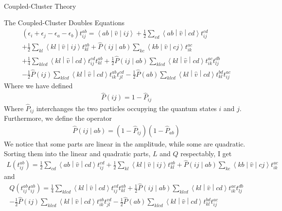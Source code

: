 \documentclass[twoside,english]{uiofysmaster}
\begin{document}
\begin{chapter}{Coupled-Cluster Theory}
\begin{section}{The Coupled-Cluster Doubles Equations}
  		\begin{align}
  			(\epsilon_i + \epsilon_j - \epsilon_a - \epsilon_b) t_{ij}^{ab} = \left<ab\middle|\hat v\middle|ij\right> + \frac{1}{2} \sum_{cd}\left<ab\middle|\hat v\middle|cd\right>t_{ij}^{cd} \\
  			+ \frac{1}{2} \sum_{kl} \left<kl\middle|\hat v\middle|ij\right>t_{kl}^{ab} + \hat P\left(ij\middle|ab\right) \sum_{kc}\left<kb\middle|\hat v\middle|cj\right>t_{ik}^{ac} \\
  			+ \frac{1}{4} \sum_{klcd}\left<kl\middle|\hat v\middle|cd\right>t_{ij}^{cd} t_{kl}^{ab} + \frac{1}{2} \hat P\left(ij\middle|ab\right) \sum_{klcd}\left<kl\middle|\hat v\middle|cd\right>t_{ik}^{ac} t_{lj}^{db}\\
  			- \frac{1}{2}\hat P(ij) \sum_{klcd}\left<kl\middle|\hat v\middle|cd\right>t_{ik}^{ab} t_{jl}^{cd} - \frac{1}{2}\hat P(ab) \sum_{klcd}\left<kl\middle|\hat v\middle|cd\right>t_{kl}^{bd} t_{ij}^{ac}
  			\label{CCD_equations1}
  		\end{align}
  		Where we have defined
  		\begin{align}
  			\hat P(ij) = 1 - \hat P_{ij}
  		\end{align}
  		Where $\hat P_{ij}$ interchanges the two particles occupying the quantum states $i$ and $j$. Furthermore, we define the operator 
  		\begin{align}
  			\hat P\left( ij \middle| ab \right) = (1 - \hat P_{ij}) (1 - \hat P_{ab})
  		\end{align}
  		We notice that some parts are linear in the amplitude, while some are quadratic. Sorting them into the linear and quadratic parts, $L$ and $Q$ respectably, I get
  		\begin{align}
  			L(t_{ij}^{ab}) = \frac{1}{2} \sum_{cd}\left<ab\middle|\hat v\middle|cd\right>t_{ij}^{cd} + \frac{1}{2} \sum_{kl} \left<kl\middle|\hat v\middle|ij\right>t_{kl}^{ab} + \hat P\left(ij\middle|ab\right) \sum_{kc}\left<kb\middle|\hat v\middle|cj\right>t_{ik}^{ac}
  		\end{align}
  		and 
  		\begin{align}
  			Q(t_{ij}^{ab}t_{ij}^{ab}) = \frac{1}{4} \sum_{klcd}\left<kl\middle|\hat v\middle|cd\right>t_{ij}^{cd} t_{kl}^{ab} + \frac{1}{2} \hat P\left(ij\middle|ab\right) \sum_{klcd}\left<kl\middle|\hat v\middle|cd\right>t_{ik}^{ac} t_{lj}^{db} \\
  			- \frac{1}{2}\hat P(ij) \sum_{klcd}\left<kl\middle|\hat v\middle|cd\right>t_{ik}^{ab} t_{jl}^{cd} - \frac{1}{2}\hat P(ab) \sum_{klcd}\left<kl\middle|\hat v\middle|cd\right>t_{kl}^{bd} t_{ij}^{ac}

\end{align}
\end{section}
\end{chapter}
\end{document}
